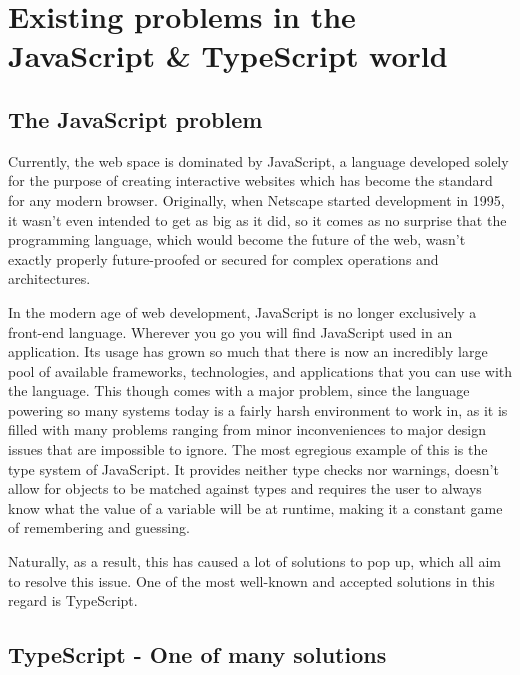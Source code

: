 \section{Existing problems in the JavaScript \& TypeScript world}

\subsection{The JavaScript problem}

Currently, the web space is dominated by JavaScript, a language developed solely for the purpose of creating interactive websites which has become the standard for any modern browser. Originally, when Netscape started development in 1995, it wasn't even intended to get as big as it did, so it comes as no surprise that the programming language, which would become the future of the web, wasn't exactly properly future-proofed or secured for complex operations and architectures.

In the modern age of web development, JavaScript is no longer exclusively a front-end language. Wherever you go you will find JavaScript used in an application. Its usage has grown so much that there is now an incredibly large pool of available frameworks, technologies, and applications that you can use with the language. This though comes with a major problem, since the language powering so many systems today is a fairly harsh environment to work in, as it is filled with many problems ranging from minor inconveniences to major design issues that are impossible to ignore. The most egregious example of this is the type system of JavaScript. It provides neither type checks nor warnings, doesn't allow for objects to be matched against types and requires the user to always know what the value of a variable will be at runtime, making it a constant game of remembering and guessing.

Naturally, as a result, this has caused a lot of solutions to pop up, which all aim to resolve this issue. One of the most well-known and accepted solutions in this regard is TypeScript.

\subsection{TypeScript - One of many solutions}

